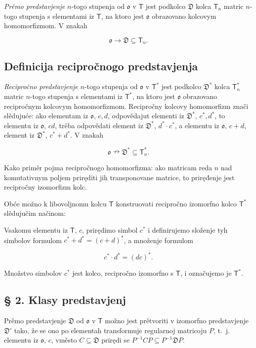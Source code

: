 \documentclass[11pt]{article}
\begin{document}
\emph{Prěmo predstavjenje} \(n\)-togo stupenja od \(\mathfrak{o}\) v \(\mathsf T\) jest podkolco \(\mathfrak D\) kolca \(\mathsf T_n\) matric \(n\)-togo stupenja s elementami iz \(\mathsf T\), na ktoro jest \(\mathfrak{o}\) obrazovano kolcovym homomorfizmom. V znakah

\[
\mathfrak{o}\to\mathfrak D\subseteq\mathsf T_n.
\]

\subsection*{Definicija recipročnogo predstavjenja}\label{definition-der-reziproken-darstellung}

\emph{Recipročno predstavjenje} \(n\)-togo stupenja od \(\mathfrak{o}\) v \(\mathsf T^*\) jest podkolco \(\mathfrak D^*\) kolca \(\mathsf T_n^*\) matric \(n\)-togo stupenja s elementami iz \(\mathsf T^*\), na ktoro jest \(\mathfrak{o}\) obrazovano recipročnym kolcovym homomorfizmom. Recipročny kolcovy homomorfizm znači slědujuće: ako elementam iz \(\mathfrak{o}\), \(c,d\), odpovědajut elementi iz \(\mathfrak D^*\), \(c^*,d^*\), to elementu iz \(\mathfrak{o}\), \(cd\), trěba odpovědati element iz \(\mathfrak D^*\), \(d^*\cdot c^*\), a elementu iz \(\mathfrak{o}\), \(c+d\), element iz \(\mathfrak D^*\), \(c^*+d^*\). V znakah

\[
\mathfrak{o}\nrightarrow\mathfrak D^*\subseteq\mathsf T_n^*.
\]

Kako priměr pojma recipročnogo homomorfizma: ako matricam reda \(n\) nad komutativnym poljem priręditi jih transponovane matrice, to priręđenje jest recipročny izomorfizm kolc.

Obće možno k libovoljnomu kolcu \(\mathsf T\) konstruovati recipročno izomorfno kolco \(\mathsf T^*\) slědujučim načinom:

Vsakomu elementu iz \(\mathsf T\), \(c\), prirędimo simbol \(c^*\) i definirujemo složenje tyh simbolov formulom \(c^*+d^*=(c+d)^*\), a množenje formulom

\[
c^*\cdot d^*=(dc)^*.
\]

Množstvo simbolov \(c^*\) jest kolco, recipročno izomorfno s \(\mathsf T\), i označujemo je \(\mathsf T^*\).

\subsection*{§ 2. Klasy predstavjenj}\label{darstellungsklassen}

Prěmo predstavjenje \(\mathfrak D\) od \(\mathfrak{o}\) v \(\mathsf T\) možno jest prětvoriti v izomorfno predstavjenje \(\mathfrak D'\) tako, že se ono po elementah transformuje regularnoj matricoju \(P\), t.~j. elementu iz \(\mathfrak{o}\), \(c\), vměsto \(C\subseteq\mathfrak D\) prirędi se \(P^{-1}CP\subseteq P^{-1}\mathfrak D P\).
\end{document}
